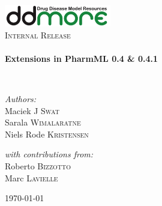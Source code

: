 \begin{titlepage}
\begin{center}

\includegraphics[width=0.35\textwidth]{./logo/ddmore_logo}~\\[1cm]

%
\textsc{\Large Internal Release}\\[0.5cm]

\HRule \\[0.4cm]
{ \huge \bfseries Extensions in PharmML 0.4 \& 0.4.1 \\[0.4cm] }

\HRule \\[1.5cm]

\begin{minipage}{0.5\textwidth}
\begin{flushleft} \large
\emph{Authors:}\\
Maciek J \textsc{Swat}\\
Sarala \textsc{Wimalaratne}\\
Niels Rode \textsc{Kristensen}
\end{flushleft}
\end{minipage}
\begin{minipage}{0.4\textwidth}
\begin{flushright} \large
\emph{with contributions from:} \\
Roberto \textsc{Bizzotto} \\
Marc \textsc{Lavielle}
\end{flushright}
\end{minipage}



\vfill

{\large \today \\}

\end{center}
\end{titlepage}
